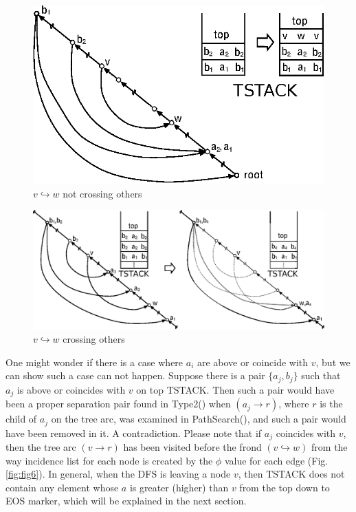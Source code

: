 \documentclass[twoside,twocolumn]{article}
\begin{document}
\begin{figure}[!htb]
\centering
\includegraphics[scale=0.7]{spqr_fig4.eps}
\caption{$v \hookrightarrow w$ not crossing others}
\label{fig:fig4}
\end{figure}

\begin{figure}[!htb]
\centering
\includegraphics[scale=0.5]{spqr_fig5.eps}
\caption{$v \hookrightarrow w$ crossing others}
\label{fig:fig5}
\end{figure}

One might wonder if there is a case where $a_i$ are above or coincide with $v$,
but we can show such a case can not happen.
Suppose there is a pair $\{a_j,b_j\}$ such that $a_j$ is above or coincides with $v$
 on top {\ttfamily TSTACK}. Then such a pair would have been a proper separation pair
found in {\ttfamily Type2()} when $(a_j \rightarrow r)$, where $r$ is the child of $a_j$
 on the tree arc, was examined in {\ttfamily PathSearch()}, and such a pair would have
 been removed in it. A contradiction.
 Please note that if $a_j$ coincides with $v$, then
 the tree arc $(v \rightarrow r)$ has been visited before the frond $(v \hookrightarrow w)$ from the way
 incidence list for each node is created by the $\phi$ value for each edge (Fig. \ref{fig:fig6}).
  In general, when the DFS is leaving
a node $v$, then {\ttfamily TSTACK} does not contain any element whose $a$ is greater (higher)
than $v$ from the top down to {\ttfamily EOS} marker, which will be explained in the next
section.
\end{document}

